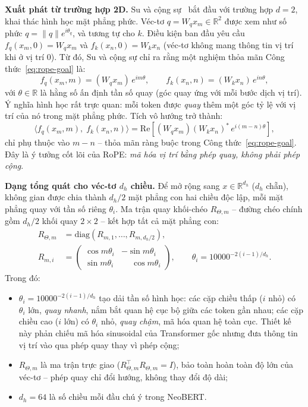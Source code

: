 \textbf{Xuất phát từ trường hợp 2D.}
Su và cộng sự~\cite{su2023roformer} bắt đầu với trường hợp $d = 2$, khai thác hình học
mặt phẳng phức. Véc-tơ $q = W_q x_m \in \mathbb{R}^2$ được xem như số phức
$q = \|q\|e^{i\theta_q}$, và tương tự cho $k$. Điều kiện ban đầu yêu cầu
$f_q(x_m, 0) = W_q x_m$ và $f_k(x_n, 0) = W_k x_n$ (véc-tơ không mang thông tin vị trí
khi ở vị trí 0). Từ đó, Su và cộng sự chỉ ra rằng một nghiệm thỏa mãn
Công thức~\eqref{eq:rope-goal} là:
\begin{equation}
  \label{eq:rope-2d}
  f_q(x_m, m) = (W_q x_m)\,e^{im\theta}, \qquad
  f_k(x_n, n) = (W_k x_n)\,e^{in\theta},
\end{equation}
với $\theta \in \mathbb{R}$ là hằng số ấn định tần số quay (góc quay ứng với mỗi bước dịch
vị trí). Ý nghĩa hình học rất trực quan: mỗi
token được \textit{quay} thêm một góc tỷ lệ với vị trí của nó trong mặt phẳng phức. Tích
vô hướng trở thành:
\[
  \bigl\langle f_q(x_m, m),\; f_k(x_n, n) \bigr\rangle
  = \mathrm{Re}\!\left[(W_q x_m)(W_k x_n)^*\, e^{i(m-n)\theta}\right],
\]
chỉ phụ thuộc vào $m - n$ -- thỏa mãn ràng buộc trong Công thức~\eqref{eq:rope-goal}.
Đây là ý tưởng cốt lõi của RoPE: \textit{mã hóa vị trí bằng phép quay, không phải phép
cộng}.

\textbf{Dạng tổng quát cho véc-tơ $d_h$ chiều.}
Để mở rộng sang $x \in \mathbb{R}^{d_h}$ ($d_h$ chẵn), không gian được chia thành $d_h/2$
mặt phẳng con hai chiều độc lập, mỗi mặt phẳng quay với tần số riêng $\theta_i$.
Ma trận quay khối-chéo $R_{\Theta,m}$ -- đường chéo chính gồm $d_h/2$ khối quay $2\times2$ --
kết hợp tất cả mặt phẳng con:
\begin{equation}
  \label{eq:rope}
  \begin{aligned}
    R_{\Theta,m} &= \mathrm{diag}\!\left(R_{m,1}, \ldots, R_{m,d_h/2}\right),\\[1mm]
    R_{m,i} &=
    \begin{pmatrix}
      \cos m\theta_i & -\sin m\theta_i \\
      \sin m\theta_i & \phantom{-}\cos m\theta_i
    \end{pmatrix},
    \qquad \theta_i = 10000^{-2(i-1)/d_h}.
  \end{aligned}
\end{equation}
Trong đó:
\begin{itemize}
  \item $\theta_i = 10000^{-2(i-1)/d_h}$ tạo dải tần số hình học: các cặp chiều thấp
        ($i$ nhỏ) có $\theta_i$ lớn, \textit{quay nhanh}, nắm bắt quan hệ cục bộ giữa các
        token gần nhau; các cặp chiều cao ($i$ lớn) có $\theta_i$ nhỏ, \textit{quay chậm},
        mã hóa quan hệ toàn cục. Thiết kế này phản chiếu mã hóa sinusoidal của Transformer
        gốc nhưng đưa thông tin vị trí vào qua phép quay thay vì phép cộng;
  \item $R_{\Theta,m}$ là ma trận trực giao ($R_{\Theta,m}^\top R_{\Theta,m} = I$), bảo toàn
        hoàn toàn độ lớn của véc-tơ -- phép quay chỉ đổi hướng, không thay đổi độ dài;
  \item $d_h = 64$ là số chiều mỗi đầu chú ý trong NeoBERT.
\end{itemize}

